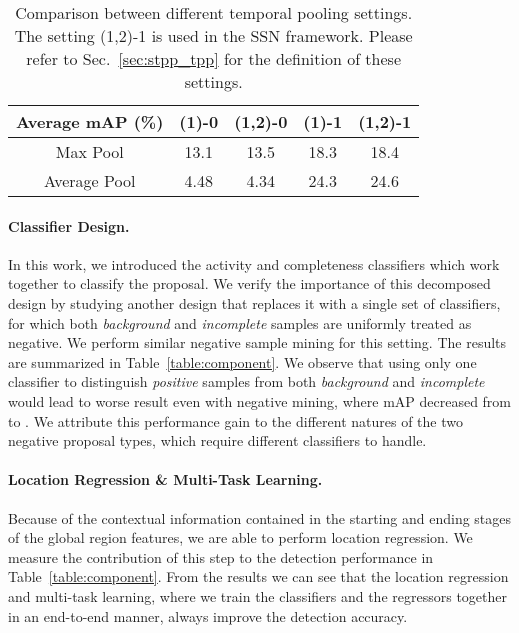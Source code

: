 \documentclass[10pt,twocolumn,letterpaper]{article}
\begin{document}
\begin{table}[t]
\begin{center}
	\begin{tabular}{c|c|c|c|c}
		\hline
		Average mAP (\%) & (1)-0 & (1,2)-0 &(1)-1 &(1,2)-1 \\ \hline
		Max Pool         & 13.1   & 13.5     & 18.3 &18.4     \\ \hline
		Average Pool     & 4.48    & 4.34      & 24.3 &24.6    \\ \hline
	\end{tabular}
\end{center}
	\caption{\small
		Comparison between different temporal pooling settings.
		The setting  (1,2)-1 is used in the SSN framework. Please refer to Sec.~\ref{sec:stpp_tpp} for the definition of these settings.}
	\label{table:pooling}
	\vspace{-12pt}
\end{table}


\vspace{-12pt}
\paragraph{Classifier Design.}
In this work, we introduced the activity and completeness classifiers which work together to classify the proposal.
We verify the importance of this decomposed design by studying another design
that replaces it with a single set of classifiers, for which
both \emph{background} and \emph{incomplete} samples are uniformly treated as negative. We perform similar negative sample mining for this setting.
The results are summarized in Table~\ref{table:component}.
We observe that using only one classifier to distinguish \emph{positive} samples
from both \emph{background} and \emph{incomplete} would lead to 
worse result even with negative mining, where mAP decreased from  to .
We attribute this performance gain to the different natures of the two negative proposal types, which require different classifiers to handle.

\vspace{-12pt}
\paragraph{Location Regression \& Multi-Task Learning.}
Because of the contextual information contained in the starting and ending stages of the global region features, we are able to perform location regression.
We measure the contribution of this step to the detection performance in Table~\ref{table:component}.
From the results we can see that the location regression and multi-task learning, where we train the classifiers and the regressors together in an end-to-end manner, always improve the detection accuracy.
\end{document}
